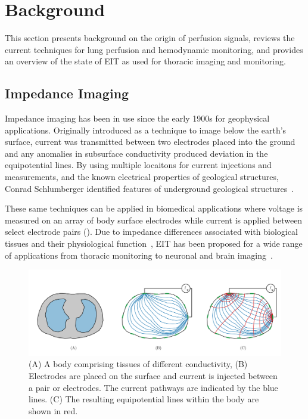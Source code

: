 \chapter{Background}
This section presents background on the 
origin of perfusion signals, reviews the current techniques for lung perfusion and hemodynamic
monitoring, and provides an overview 
of the state of EIT as used for thoracic imaging and monitoring.

\section{Impedance Imaging}
\label{sec:impedance_imaging}
Impedance imaging has been in use since the early 1900s for geophysical applications.  
Originally introduced as a technique to image below the earth’s surface, 
current was transmitted between two electrodes placed into the ground and any 
anomalies in subsurface conductivity produced deviation 
in the equipotential lines. 
By using multiple locaitons for current injections and measurements, 
and the known 
electrical properties of geological structures, Conrad Schlumberger identified
features of underground geological structures~\parencite{allaud_schlumberger_1977}.

These same techniques can be applied in biomedical applications where
voltage is measured on an array of body surface electrodes 
while current is applied between select electrode pairs (). 
Due to impedance differences associated with biological tissues and their physiological 
function~\parencite{geddes_specific_1967,mcadams_tissue_1995},
EIT has been proposed for a wide range of applications from thoracic monitoring
\parencite{frerichs_chest_2017} to neuronal and 
brain imaging~\parencite{holder_electrical_1992}.

\begin{figure}[H]
    \centering
   \includegraphics[width=\textwidth]{chapter2-background/imgs/current_and_equipotential_lines.pdf}
   \caption[Current and Equipotential lines]{\label{fig:cur_equip_line} 
   (A) A body comprising tissues of different conductivity, (B) Electrodes are placed on the surface 
   and current is injected between a pair or electrodes. The current pathways are indicated 
   by the blue lines. (C) The resulting equipotential lines within the body are shown in red.}
\end{figure}

